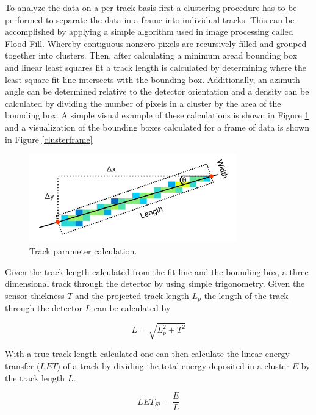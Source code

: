To analyze the data on a per track basis first a clustering procedure has to be performed to separate the data in a frame into individual tracks. This can be accomplished by applying a simple algorithm used in image processing called Flood-Fill. Whereby contiguous nonzero pixels are recursively filled and grouped together into clusters. Then, after calculating a minimum aread bounding box and linear least squares fit a track length is calculated by determining where the least square fit line intersects with the bounding box. Additionally, an azimuth angle can be determined relative to the detector orientation and a density can be calculated by dividing the number of pixels in a cluster by the area of the bounding box. A simple visual example of these calculations is shown in Figure \ref{track_analysis} and a visualization of the bounding boxes calculated for a frame of data is shown in Figure \ref{clusterframe}

\begin{figure}[H]
	\begin{center}
	\includegraphics[width=0.8\textwidth]{figures/density.png}
	\caption{Track parameter calculation.\cite{stuartthesis}}
	\label{track_analysis}
	\end{center}
\end{figure}

Given the track length calculated from the fit line and the bounding box, a three-dimensional track through the detector by using simple trigonometry. Given the sensor thickness $T$ and the projected track length $L_{p}$ the length of the track through the detector $L$ can be calculated by

\[L = \sqrt{L_{p}^{2} + T^{2}} \]

With a true track length calculated one can then calculate the linear energy transfer ($LET$) of a track by dividing the total energy deposited in a cluster $E$ by the track length $L$.

\[LET_{Si} = \frac{E}{L}\]






